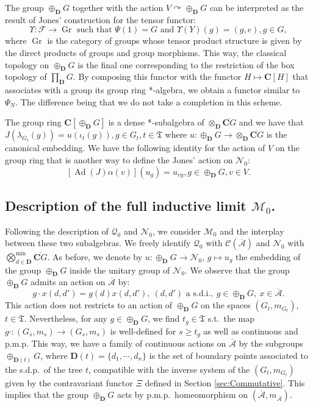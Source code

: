 \documentclass[a4paper,12pt]{amsart}
\numberwithin{equation}{section}
\theoremstyle{definition}
\DeclareMathOperator{\Gr}{Gr}
\newcommand{\act}{\curvearrowright}
\newcommand{\al}{\alpha}
\newcommand{\oscrA}{{\overline{\mathscr{A}}}}
\DeclareMathOperator{\Ad}{Ad}
\newcommand{\scrC}{\mathscr C}
\newcommand{\C}{\mathbf C}
\newcommand{\D}{\mathbf D}
\newcommand{\cF}{\mathcal F}
\newcommand{\Gd}{\oplus_\D G}
\newcommand{\la}{\lambda}
\newcommand{\scrM}{\mathscr M}
\newcommand{\scrN}{\mathscr N}
\newcommand{\scrQ}{\mathscr Q}
\newcommand{\fT}{\mathfrak T}
\begin{document}
The group $\oplus_\D G$ together with the action $V\act \oplus_\D G$ can be interpreted as the result of Jones' construction for the tensor functor: 
$$\Upsilon:\cF\to \Gr \text{ such that } \Psi(1)=G \text{ and } \Upsilon(Y)(g) = (g,e), g\in G,$$
where $\Gr$ is the category of groups whose tensor product structure is given by the direct products of groups and group morphisms. 
This way, the classical topology on $\oplus_\D G$ is the final one corresponding to the restriction of the box topology of $\prod_\D G$.
By composing this functor with the functor $H\mapsto \C[H]$ that associates with a group its group ring *-algebra, we obtain a functor similar to $\Psi_N$. The difference being that we do not take a completion in this scheme. 

The group ring $\C [\Gd]$ is a dense *-subalgebra of $\otimes_\D \overline{\C G}$ and we have that $J(\la_{G_t}(g)) = u(\iota_t(g)), g\in G_t, t\in\fT$ where $u:\Gd\to \otimes_\D \overline{\C G}$ is the canonical embedding.
We have the following identity for the action of $V$ on the group ring that is another way to define the Jones' action on $\scrN_0$:
$$[\Ad(J)\al(v)](u_g) = u_{vg}, g\in\Gd, v\in V.$$ 

\subsection{Description of the full inductive limit $\scrM_0$.}\label{sec:M_0}

Following the description of $\scrQ_0$ and $\scrN_0$, we consider $\scrM_0$ and the interplay between these two subalgebras.
We freely identify $\scrQ_0$ with $\scrC(\oscrA)$ and $\scrN_0$ with $\bigotimes_{d\in\D}^{\min} \overline{\C G}$. 
As before, we denote by $u:\Gd\to \scrN_0$, $g\mapsto u_g$ the embedding of the group $\Gd$ inside the unitary group of $\scrN_0.$
We observe that the group $\oplus_\D G$ admits an action on $\oscrA$ by:
\begin{equation}\label{equa:GA}g\cdot x(d,d') = g(d) x(d,d'), \ (d,d') \text{ a s.d.i.},\ g\in \oplus_\D G,\ x\in \oscrA.\end{equation}
This action does not restricts to an action of $\oplus_\D G$ on the spaces $(G_t,m_{G_t})$, $t\in\fT$. Nevertheless, for any $g\in\oplus_\D G$, we find $t_{g}\in\fT$ s.t.~the map $g\cdot:(G_{s},m_{s})\rightarrow (G_{s},m_{s})$ is well-defined for $s\geq t_{g}$ as well as continuous and p.m.p.
This way, we have a family of continuous actions on $\oscrA$ by the subgroups $\oplus_{\D(t)} G$, where $\D(t)=\{d_1,\cdots,d_n\}$ is the set of boundary points associated to the s.d.p.~of the tree $t$, compatible with the inverse system of the $(G_t,m_{G_t})$ given by the contravariant functor $\Xi$ defined in Section \ref{sec:Commutative}.
This implies that the group $\oplus_\D G$ acts by p.m.p.~homeomorphism on $(\oscrA,m_\oscrA)$.
\end{document}
